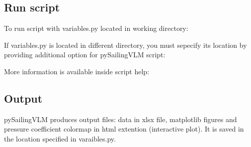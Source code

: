 \documentclass[letterpaper,10pt,english]{jupyterBook}
\begin{document}
\subsection{Run script}
\label{\detokenize{chapters/usage:run-script}}
\sphinxAtStartPar
To run script with variables.py located in working directory:

\begin{sphinxVerbatim}[commandchars=\\\{\}]
\end{sphinxVerbatim}

\sphinxAtStartPar
If variables.py is located in different directory, you must sepecify its location by providing additional option for pySailingVLM script:

\begin{sphinxVerbatim}[commandchars=\\\{\}]
  
\end{sphinxVerbatim}

\sphinxAtStartPar
More information is available inside script help:

\begin{sphinxVerbatim}[commandchars=\\\{\}]
 
\end{sphinxVerbatim}


\subsection{Output}
\label{\detokenize{chapters/usage:output}}
\sphinxAtStartPar
pySailingVLM produces output files: data in xlsx file, matplotlib figures and pressure coefficient colormap in html extention (interactive plot). It is saved in the location specified in varaibles.py.
\end{document}
